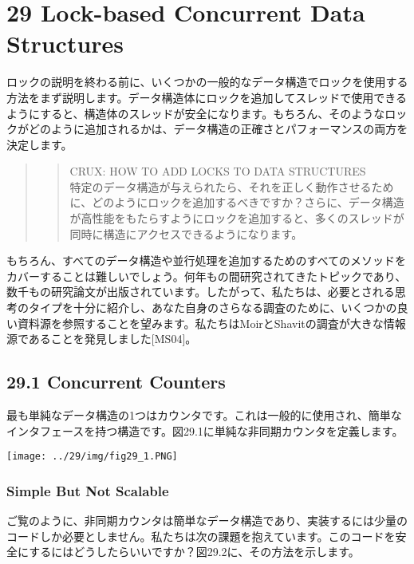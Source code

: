 \hypertarget{lock-based-concurrent-data-structures}{%
\section*{29 Lock-based Concurrent Data
Structures}\label{lock-based-concurrent-data-structures}}

ロックの説明を終わる前に、いくつかの一般的なデータ構造でロックを使用する方法をまず説明します。データ構造体にロックを追加してスレッドで使用できるようにすると、構造体のスレッドが安全になります。もちろん、そのようなロックがどのように追加されるかは、データ構造の正確さとパフォーマンスの両方を決定します。

\begin{quote}
\begin{quote}
CRUX: HOW TO ADD LOCKS TO DATA STRUCTURES\\
特定のデータ構造が与えられたら、それを正しく動作させるために、どのようにロックを追加するべきですか？さらに、データ構造が高性能をもたらすようにロックを追加すると、多くのスレッドが同時に構造にアクセスできるようになります。
\end{quote}
\end{quote}

もちろん、すべてのデータ構造や並行処理を追加するためのすべてのメソッドをカバーすることは難しいでしょう。何年もの間研究されてきたトピックであり、数千もの研究論文が出版されています。したがって、私たちは、必要とされる思考のタイプを十分に紹介し、あなた自身のさらなる調査のために、いくつかの良い資料源を参照することを望みます。私たちはMoirとShavitの調査が大きな情報源であることを発見しました{[}MS04{]}。

\hypertarget{concurrent-counters}{%
\subsection*{29.1 Concurrent Counters}\label{concurrent-counters}}

最も単純なデータ構造の1つはカウンタです。これは一般的に使用され、簡単なインタフェースを持つ構造です。図29.1に単純な非同期カウンタを定義します。

\texttt{[image: ../29/img/fig29\_1.PNG]}

\hypertarget{simple-but-not-scalable}{%
\subsubsection*{Simple But Not Scalable}\label{simple-but-not-scalable}}

ご覧のように、非同期カウンタは簡単なデータ構造であり、実装するには少量のコードしか必要としません。私たちは次の課題を抱えています。このコードを安全にするにはどうしたらいいですか？図29.2に、その方法を示します。

